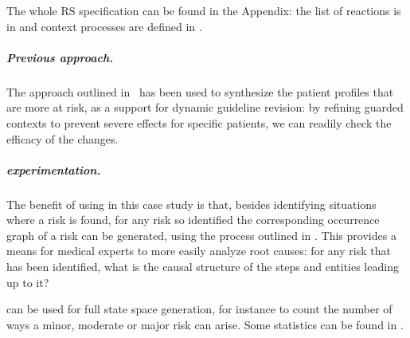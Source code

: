 The whole RS specification can be found in the Appendix: the list of reactions is in  and context processes are defined in .

\subparagraph*{Previous approach.}
The approach outlined in~\cite{DBLP:conf/cmsb/BowlesBBFGM24} has been used to synthesize the patient profiles that are more at risk, as a support for dynamic guideline revision: by refining guarded contexts to prevent severe effects for specific patients, we can readily check the efficacy of the changes.

\subparagraph*{\GROOVE experimentation.}

The benefit of using \GROOVE in this case study is that, besides identifying situations where a risk is found, for any risk so identified the corresponding occurrence graph of a risk can be generated, using the process outlined in . This provides a means for medical experts to more easily analyze root causes: for any risk that has been identified, what is the causal structure of the steps and entities leading up to it?

\GROOVE can be used for full state space generation, for instance to count the number of ways a minor, moderate or major risk can arise. Some statistics can be found in .

